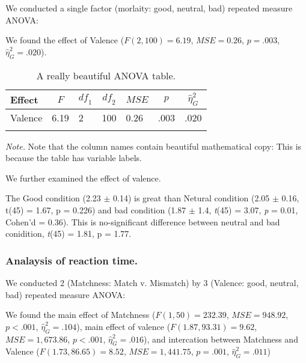 \documentclass[man]{apa6}
\begin{document}
We conducted a single factor (morlaity: good, neutral, bad) repeated measure ANOVA:

We found the effect of Valence (\(F(2, 100) = 6.19\), \(\mathit{MSE} = 0.26\), \(p = .003\), \(\hat{\eta}^2_G = .020\)).

\begin{table}[tbp]
\begin{center}
\begin{threeparttable}
\caption{\label{tab:unnamed-chunk-1}A really beautiful ANOVA table.}
\begin{tabular}{lllllll}
\toprule
Effect & \multicolumn{1}{c}{$F$} & \multicolumn{1}{c}{$\mathit{df}_1$} & \multicolumn{1}{c}{$\mathit{df}_2$} & \multicolumn{1}{c}{$\mathit{MSE}$} & \multicolumn{1}{c}{$p$} & \multicolumn{1}{c}{$\hat{\eta}^2_G$}\\
\midrule
Valence & 6.19 & 2 & 100 & 0.26 & .003 & .020\\
\bottomrule
\addlinespace
\end{tabular}
\begin{tablenotes}[para]
\normalsize{\textit{Note.} Note that the column names contain beautiful mathematical copy: This is because the table has variable labels.}
\end{tablenotes}
\end{threeparttable}
\end{center}
\end{table}

We further examined the effect of valence.

The Good condition (2.23 \(\pm\) 0.14) is great than Netural condition (2.05 \(\pm\) 0.16, t(45) = 1.67, p = 0.226) and bad condition (1.87 \(\pm\) 1.4, \emph{t}(45) = 3.07, \emph{p} = 0.01, Cohen'd = 0.36). This is no-significant difference between neutral and bad conidition, \emph{t}(45) = 1.81, p = 1.77.

\hypertarget{analaysis-of-reaction-time.}{%
\subsubsection{Analaysis of reaction time.}\label{analaysis-of-reaction-time.}}

We conducted 2 (Matchness: Match v. Mismatch) by 3 (Valence: good, neutral, bad) repeated measure ANOVA:

We found the main effect of Matchness (\(F(1, 50) = 232.39\), \(\mathit{MSE} = 948.92\), \(p < .001\), \(\hat{\eta}^2_G = .104\)), main effect of valence (\(F(1.87, 93.31) = 9.62\), \(\mathit{MSE} = 1,673.86\), \(p < .001\), \(\hat{\eta}^2_G = .016\)), and intercation between Matchness and Valence (\(F(1.73, 86.65) = 8.52\), \(\mathit{MSE} = 1,441.75\), \(p = .001\), \(\hat{\eta}^2_G = .011\))
\end{document}
